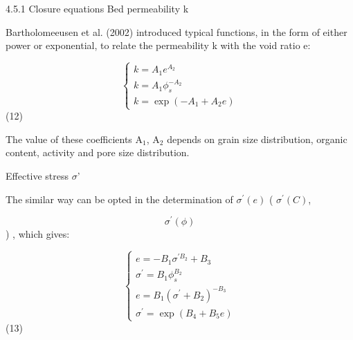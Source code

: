 4.5.1 Closure equations\newline
Bed permeability k

Bartholomeeusen et al. (2002) introduced typical functions, in the form of
either power or exponential, to relate the permeability k with the void
ratio e:

\begin{equation*}
\left\{ 
\begin{array}{l}
k=A_{1} e^{A_{2} } \\ 
k=A_{1} \phi _{s} ^{-A_{2} } \\ 
k=\exp (-A_{1} +A_{2} e)%
\end{array}
\right. 
\end{equation*}%
\hspace{5mm} \hspace{5mm} \hspace{5mm} \hspace{5mm} \hspace{5mm} \hspace{5mm}
\hspace{5mm} \hspace{5mm} (12)

The value of these coefficients A$_{1}$, A$_{2}$ depends on grain size
distribution, organic content, activity and pore size distribution.

Effective stress $\sigma$'

The similar way can be opted in the determination of $\sigma ^{\prime }(e)$
( $\sigma ^{\prime }(C)$,

\begin{equation*}
\sigma ^{\prime }(\phi ) 
\end{equation*}%
) , which gives:

\begin{equation*}
\left\{ 
\begin{array}{l}
e=-B_1 \sigma ^{\prime B_2} +B_3 \\ 
\sigma ^{\prime}=B_1 \phi_{s}^{B_2} \\ 
e=B_1 (\sigma ^{\prime } + B_{2})^{-B_{3}} \\ 
\sigma ^{\prime}=\exp (B_4+B_5 e)%
\end{array}
\right. 
\end{equation*}%
\hspace{5mm} \hspace{5mm} \hspace{5mm} \hspace{5mm} \hspace{5mm} \hspace{5mm}
\hspace{5mm} \hspace{5mm} (13)

